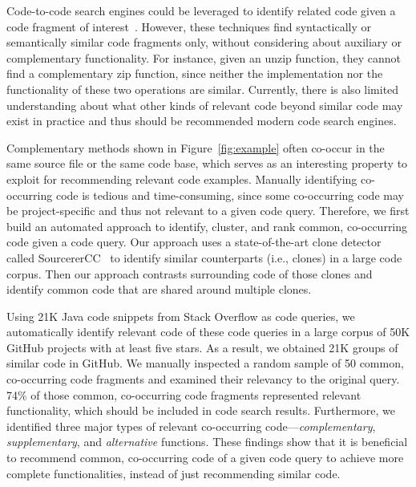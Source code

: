 
 
Code-to-code search engines could be leveraged to identify related code given a code 
fragment of interest~\cite{kim2018Facoy, krugle, searchcode}. 
However, these techniques find syntactically or semantically similar code fragments 
only, without considering about auxiliary or complementary functionality. 
For instance, given an unzip function, they cannot find a complementary zip function, since neither
the implementation nor the functionality of these two operations are similar. 
Currently,  there is also limited understanding about what other kinds of relevant code beyond similar code
may exist in practice and thus should be recommended modern code search engines. 



Complementary methods shown in Figure~\ref{fig:example} often co-occur in the same source file or the same code base, which serves as an interesting property to exploit for recommending relevant code examples.
Manually identifying co-occurring code is tedious and time-consuming, 
since some co-occurring code may be project-specific and thus not relevant to a given code query. 
Therefore, we first build an automated approach to identify, cluster, and rank common, 
co-occurring code given a code query.  
Our approach uses a state-of-the-art clone detector called SourcererCC~\cite{sajnani2016sourcerercc} to identify similar
counterparts (i.e., clones) in a large code corpus. Then our approach contrasts surrounding code of those clones 
and identify common code that are shared around multiple clones.

Using 21K Java code snippets from Stack Overflow
as code queries, we automatically identify relevant code of these code queries in a large corpus of  50K GitHub projects with at least five stars. 
As a result, we obtained 21K groups of similar code in GitHub. We manually inspected a random sample of 50 common, co-occurring code fragments and examined their relevancy to the original query. 
74\% of those common, co-occurring code fragments represented relevant functionality, 
which should be included in code search results. 
Furthermore, we identified three major types of relevant co-occurring code---{\em complementary}, {\em supplementary}, and {\em alternative} functions. These findings show that it is beneficial to recommend common, co-occurring code of a given code query to achieve more complete functionalities, instead of just recommending similar code. 

